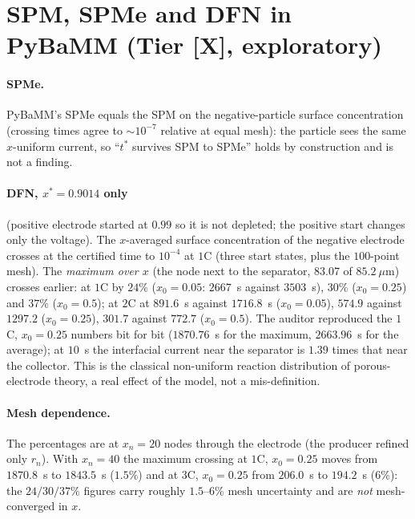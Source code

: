 \documentclass[10pt]{article}
\newcommand{\tier}[1]{\textsf{[#1]}}
\newcommand{\tX}{\tier{X}}
\begin{document}
\section{SPM, SPMe and DFN in PyBaMM (Tier \tX{}, exploratory)}\label{sec:dfn}
\paragraph{SPMe.} PyBaMM's SPMe equals the SPM on the negative-particle surface concentration (crossing times agree to $\sim10^{-7}$ relative at equal mesh): the particle sees the same $x$-uniform current, so ``$t^*$ survives SPM to SPMe'' holds by construction and is not a finding.
\paragraph{DFN, $x^*=0.9014$ only} (positive electrode started at $0.99$ so it is not depleted; the positive start changes only the voltage). The $x$-averaged surface concentration of the negative electrode crosses at the certified time to $10^{-4}$ at $1$C (three start states, plus the $100$-point mesh). The \emph{maximum over $x$} (the node next to the separator, $83.07$ of $85.2~\mu$m) crosses earlier: at $1$C by $24\%$ ($x_0=0.05$: $2667$~s against $3503$~s), $30\%$ ($x_0=0.25$) and $37\%$ ($x_0=0.5$); at $2$C at $891.6$~s against $1716.8$~s ($x_0=0.05$), $574.9$ against $1297.2$ ($x_0=0.25$), $301.7$ against $772.7$ ($x_0=0.5$). The auditor reproduced the $1$C, $x_0=0.25$ numbers bit for bit ($1870.76$~s for the maximum, $2663.96$~s for the average); at $10$~s the interfacial current near the separator is $1.39$ times that near the collector. This is the classical non-uniform reaction distribution of porous-electrode theory, a real effect of the model, not a mis-definition.
\paragraph{Mesh dependence.} The percentages are at $x_n=20$ nodes through the electrode (the producer refined only $r_n$). With $x_n=40$ the maximum crossing at $1$C, $x_0=0.25$ moves from $1870.8$~s to $1843.5$~s ($1.5\%$) and at $3$C, $x_0=0.25$ from $206.0$~s to $194.2$~s ($6\%$): the $24/30/37\%$ figures carry roughly $1.5$--$6\%$ mesh uncertainty and are \emph{not} mesh-converged in $x$.
\end{document}
